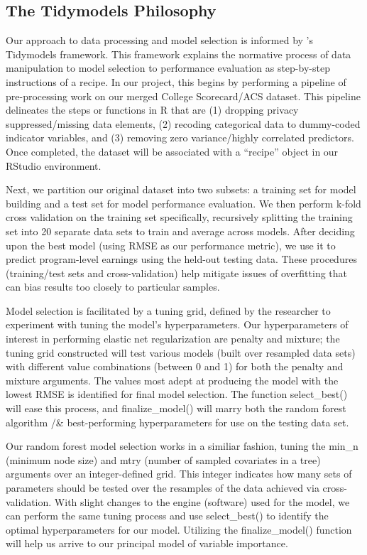 \documentclass[a4paper, 12pt]{article}
\begin{document}
\subsection*{The Tidymodels Philosophy}

Our approach to data processing and model selection is informed by
\textcite{Kuhn_Silge_2022}'s Tidymodels framework. This framework
explains the normative process of data manipulation to model selection
to performance evaluation as step-by-step instructions of a recipe. In
our project, this begins by performing a pipeline of pre-processing
work on our merged College Scorecard/ACS dataset. This pipeline
delineates the steps or functions in R that are (1) dropping privacy
suppressed/missing data elements, (2) recoding categorical data to
dummy-coded indicator variables, and (3) removing zero variance/highly
correlated predictors. Once completed, the dataset will be associated
with a ``recipe'' object in our RStudio environment. 

Next, we partition our original dataset into two subsets: a training
set for model building and a test set for model performance
evaluation.  We then perform k-fold cross validation on the training
set specifically, recursively splitting the training set into 20
separate data sets to train and average across models. After deciding
upon the best model (using RMSE as our performance metric), we use it
to predict program-level earnings using the held-out testing
data. These procedures (training/test sets and cross-validation) help
mitigate issues of overfitting that can bias results too closely to
particular samples.

Model selection is facilitated by a tuning grid, defined by the
researcher to experiment with tuning the model's hyperparameters. Our
hyperparameters of interest in performing elastic net regularization
are penalty and mixture; the tuning grid constructed will test various
models (built over resampled data sets) with different value
combinations (between 0 and 1) for both the penalty and mixture
arguments. The values most adept at producing the model with the
lowest RMSE is identified for final model selection. The function
select\_best() will ease this process, and finalize\_model() will marry
both the random forest algorithm /& best-performing hyperparameters
for use on the testing data set.

Our random forest model selection works in a similiar fashion, tuning
the min\_n (minimum node size) and mtry (number of sampled covariates
in a tree) arguments over an integer-defined grid. This integer
indicates how many sets of parameters should be tested over the
resamples of the data achieved via cross-validation. With slight
changes to the engine (software) used for the model, we can perform
the same tuning process and use select\_best() to identify the optimal
hyperparameters for our model. Utilizing the finalize\_model() function
will help us arrive to our principal model of variable importance.
\end{document}
